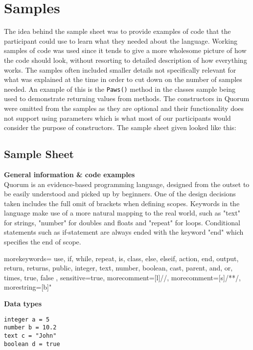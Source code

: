 \section{Samples}
The idea behind the sample sheet was to provide examples of code that the participant could use to learn what they needed about the language.
Working samples of code was used since it tends to give a more wholesome picture of how the code should look, without resorting to detailed description of how everything works.
The samples often included smaller details not specifically relevant for what was explained at the time in order to cut down on the number of samples needed.
An example of this is the \lstinline!Paws()! method in the classes sample being used to demonstrate returning values from methods.
The constructors in Quorum were omitted from the samples as they are optional and their functionality does not support using parameters which is what most of our participants would consider the purpose of constructors.
The sample sheet given looked like this:%

\subsection{Sample Sheet}
\textbf{General information \& code examples}\\
Quorum is an evidence-based programming language, designed from the outset to be easily understood and picked up by beginners. One of the design decisions taken includes the full omit of brackets when defining scopes. Keywords in the language make use of a more natural mapping to the real world, such as "text" for strings, "number" for doubles and floats  and "repeat" for loops. Conditional statements such as if-statement are always ended with the keyword "end" which specifies the end of scope.

{
  morekeywords={
    use,
    if,
    while,
    repeat,
    is,
    class,
    else,
    elseif,
    action,
    end,
    output,
    return,
    returns,
    public,
    integer,
    text,
    number,
    boolean,
    cast,
    parent,
    and,
    or,
    times,
    true,
    false
  },
  sensitive=true, %
  morecomment=[l]{//}, %
  morecomment=[s]{/*}{*/}, %
  morestring=[b]" %
}

\textbf{Data types}\\
\begin{lstlisting}[language=Quorum]
integer a = 5
number b = 10.2
text c = "John"
boolean d = true
\end{lstlisting}

